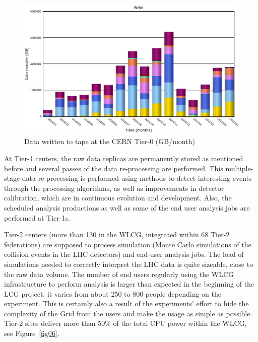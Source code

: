 \documentclass{intech}
\begin{document}
\begin{figure}[htb] %
\centering
\includegraphics[width=13cm]{fig05.eps} %
\caption{Data written to tape at the CERN Tier-0
(GB/month)}\label{fig05}
\end{figure}


At Tier-1 centers, the raw data replicas are permanently stored as
mentioned before and several passes of the data re-processing are
performed. This multiple-stage data re-processing is performed using
methods to detect interesting events through the processing
algorithms, as well as improvements in detector calibration, which
are in continuous evolution and development. Also, the scheduled
analysis productions as well as some of the end user analysis jobs
are performed at Tier-1s.

Tier-2 centers  (more than 130 in the WLCG, integrated within 68
Tier-2 federations) are supposed to process simulation (Monte Carlo
simulations of the collision events in the LHC detectors) and
end-user analysis jobs. The load of simulations needed to correctly
interpret the LHC data is quite sizeable, close to the raw data
volume. The number of end users regularly using the WLCG
infrastructure to perform analysis is larger than expected in the
beginning of the LCG project, it varies from about 250 to 800 people
depending on the experiment. This is certainly also a result of the
experiments' effort to hide the complexity of the Grid from the
users and make the usage as simple as possible. Tier-2 sites deliver
more than 50\% of the total CPU power within the WLCG, see
Figure~\ref{fig06}.
\end{document}
